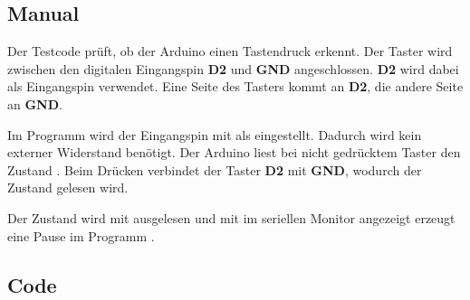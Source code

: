 \subsection{Manual}
Der Testcode prüft, ob der Arduino einen Tastendruck erkennt. Der Taster wird zwischen den digitalen Eingangspin \textbf{D2} und \textbf{GND} angeschlossen. \textbf{D2} wird dabei als Eingangspin verwendet. Eine Seite des Tasters kommt an \textbf{D2}, die andere Seite an \textbf{GND}.

Im Programm wird der Eingangspin mit  als  eingestellt. Dadurch wird kein externer Widerstand benötigt. Der Arduino liest bei nicht gedrücktem Taster den Zustand . Beim Drücken verbindet der Taster \textbf{D2} mit \textbf{GND}, wodurch der Zustand  gelesen wird.

Der Zustand wird mit  ausgelesen und mit  im seriellen Monitor angezeigt  erzeugt eine Pause im Programm \cite{arduino_pinmode}\cite{arduino_digitalread}\cite{arduino:language-reference}.

\subsection{Code}

{
	\label{lst:TestButton}
}